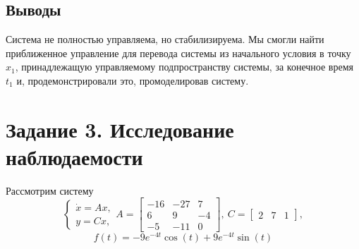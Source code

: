 \documentclass[a4paper, 12pt]{article}
\begin{document}
    \subsection{Выводы}
    Система не полностью управляема, но стабилизируема. Мы смогли найти приближенное управление для перевода системы из начального условия
    в точку $x_1$, принадлежащую управляемому подпространству системы, за конечное время $t_1$ и, продемонстрировали это, промоделировав систему.


    \section{Задание 3. Исследование наблюдаемости}
    Рассмотрим систему
    $$
    \begin{cases}
        \dot{x}=Ax,\\
        y=Cx,
    \end{cases} A=\begin{bmatrix}
        -16 &-27 &7\\
        6 &9 &-4\\
        -5 &-11 &0
    \end{bmatrix},\ C=\begin{bmatrix}
        2 &7 &1
    \end{bmatrix},
    $$
    $$f(t)=-9e^{-4t}\cos{(t)}+9e^{-4t}\sin{(t)}$$
\end{document}
